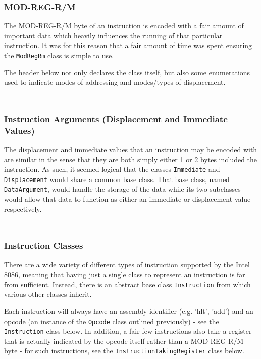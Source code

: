         \inputminted{c++}{code/third/opcode.hpp}

        \inputminted{c++}{code/third/opcode.cpp}

    \subsubsection{MOD-REG-R/M}
        The MOD-REG-R/M byte of an instruction is encoded with a fair amount of important data which heavily influences the running of that particular instruction. It was for this reason that a fair amount of time was spent ensuring the \texttt{ModRegRm} class is simple to use.

        The header below not only declares the class itself, but also some enumerations used to indicate modes of addressing and modes/types of displacement.

        \inputminted{c++}{code/third/modregrm.hpp}

        \inputminted{c++}{code/third/modregrm.cpp}

    \subsubsection{Instruction Arguments (Displacement and Immediate Values)}
        The displacement and immediate values that an instruction may be encoded with are similar in the sense that they are both simply either 1 or 2 bytes included the instruction. As such, it seemed logical that the classes \texttt{Immediate} and \texttt{Displacement} would share a common base class. That base class, named \texttt{DataArgument}, would handle the storage of the data while its two subclasses would allow that data to function as either an immediate or displacement value respectively.

        \inputminted{c++}{code/third/argument.hpp}

        \inputminted{c++}{code/third/argument.cpp}

    \subsubsection{Instruction Classes}
        There are a wide variety of different types of instruction supported by the Intel 8086, meaning that having just a single class to represent an instruction is far from sufficient. Instead, there is an abstract base class \texttt{Instruction} from which various other classes inherit.

        Each instruction will always have an assembly identifier (e.g. 'hlt', 'add') and an opcode (an instance of the \texttt{Opcode} class outlined previously) - see the \texttt{Instruction} class below. In addition, a fair few instructions also take a register that is actually indicated by the opcode itself rather than a MOD-REG-R/M byte - for such instructions, see the \texttt{InstructionTakingRegister} class below.

